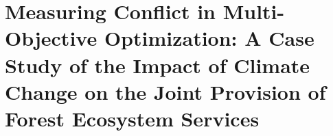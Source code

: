  
\chapter{Measuring Conflict in Multi-Objective Optimization: A Case Study of the Impact of Climate Change on the Joint Provision of Forest Ecosystem Services}




